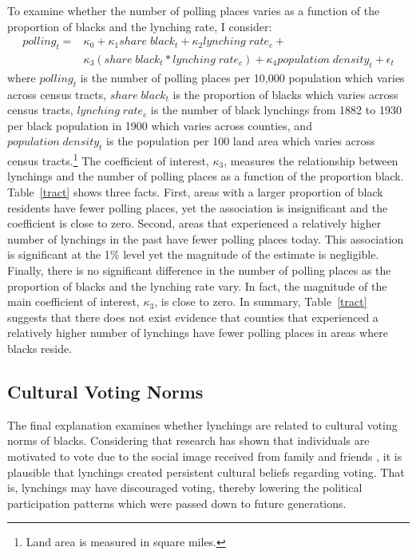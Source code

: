 \documentclass[AEJ, finalmode]{AEA}
\begin{document}
To examine whether the number of polling places varies as a function of the proportion of blacks and the lynching rate, I consider:
\begin{equation}
\begin{aligned}
polling_{t} = & \kappa_{0} + \kappa_{1}share\;black_{t} + \kappa_{2}lynching\;rate_{c} + \\ & \kappa_{3}(share\;black_{t}*lynching\;rate_{c}) + \kappa_{4}population\;density_{t} + \epsilon_{t}
\end{aligned}
\label{pollequ}
\end{equation}
where $polling_{t}$ is the number of polling places per 10,000 population which varies across census tracts, $share\;black_{t}$ is the proportion of blacks which varies across census tracts, $lynching\;rate_{c}$ is the number of black lynchings from 1882 to 1930 per black population in 1900 which varies across counties, and $population\;density_{t}$ is the population per 100 land area which varies across census tracts.\footnote{Land area is measured in square miles.} The coefficient of interest, $\kappa_{3}$, measures the relationship between lynchings and the number of polling places as a function of the proportion black. Table~\ref{tract} shows three facts. First, areas with a larger proportion of black residents have fewer polling places, yet the association is insignificant and the coefficient is close to zero. Second, areas that experienced a relatively higher number of lynchings in the past have fewer polling places today. This association is significant at the 1\% level yet the magnitude of the estimate is negligible. Finally, there is no significant difference in the number of polling places as the proportion of blacks and the lynching rate vary. In fact, the magnitude of the main coefficient of interest, $\kappa_{3}$, is close to zero. In summary, Table~\ref{tract} suggests that there does not exist evidence that counties that experienced a relatively higher number of lynchings have fewer polling places in areas where blacks reside.

\subsection{Cultural Voting Norms}

The final explanation examines whether lynchings are related to cultural voting norms of blacks. Considering that research has shown that individuals are motivated to vote due to the social image received from family and friends \cite{dellavigna2016voting}, it is plausible that lynchings created persistent cultural beliefs regarding voting. That is, lynchings may have discouraged voting, thereby lowering the political participation patterns which were passed down to future generations.
\end{document}
